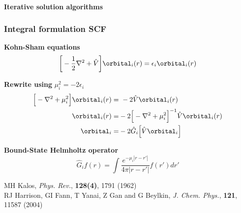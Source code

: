 \begin{frame}
    \centering
    \textbf{\Large{Iterative solution algorithms}}
\end{frame}

\begin{frame}
    \frametitle{Integral formulation SCF}
    \centering
    \textbf{Kohn-Sham equations}
    \begin{equation}
	\nonumber
	\bigg[-\frac{1}{2}\nabla^2 + \hat{V}\bigg]\orbital_i(r) = \epsilon_i \orbital_i(r)
    \end{equation}

    \vspace{5mm}

    \textbf{Rewrite using} $\mu_i^2 = -2\epsilon_i$
    \begin{align}
	\nonumber
	\Big[-\nabla^2 + \mu_i^2\Big]\orbital_i(r) =&\ -2\hat{V}\orbital_i(r)\\
	\nonumber
	\orbital_i(r) =&-2\Big[-\nabla^2 + \mu_i^2\Big]^{-1}\hat{V}\orbital_i(r)\\
	\nonumber
	\orbital_i =&-2\hat{G}_i\Big[\hat{V}\orbital_i\Big]
    \end{align}

    \vspace{5mm}

    \textbf{Bound-State Helmholtz operator}
    \begin{equation}
	\nonumber
	\hat{G}_if(r) = \int \frac{e^{-\mu_i |r-r'|}}{4\pi|r-r'|}f(r')dr'
    \end{equation}

    \vspace{5mm}

    \centering
    \tiny
    MH Kalos,
    {\it Phys. Rev.}, 
    \textbf{128(4)},
    1791 (1962)\\
    RJ Harrison, GI Fann, T Yanai, Z Gan and G Beylkin,
    {\it J. Chem. Phys.}, 
    \textbf{121},
    11587 (2004)
\end{frame}


